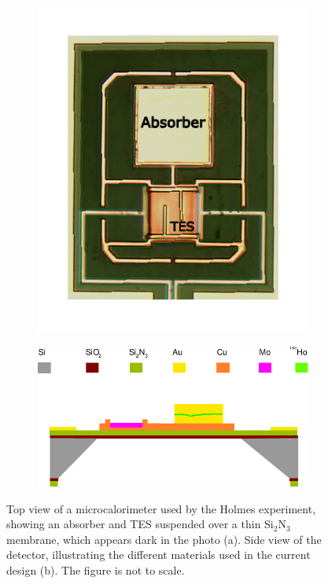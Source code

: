 \begin{figure}[!b]
    \begin{subfigure}[b]{0.3\linewidth}
\includegraphics[width=\linewidth]{figures/ch1/TES.pdf}
\caption{}
\end{subfigure}
\hspace{1.5cm}
\begin{subfigure}[b]{0.55\linewidth}
    \includegraphics[width=\linewidth]{figures/ch1/TESdesign.pdf}
\caption{}
\end{subfigure}
\caption{Top view of a microcalorimeter used by the Holmes experiment, showing an absorber and TES suspended over a
thin Si$_2$N$_3$ membrane, which appears dark in the photo (a). Side view of the detector, illustrating the different
materials used in the current design (b). The figure is not to scale.} 
\label{fig:TES}
\end{figure}
